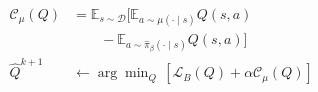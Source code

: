 \documentclass[border=7pt]{standalone}
\begin{document}
\color{ink}
$\displaystyle \begin{aligned} \mathcal C_\mu(Q)&=\mathbb E_{s\sim\mathcal D}\!\big[\mathbb E_{a\sim\mu(\cdot\mid s)}Q(s,a)\\ &\qquad-\mathbb E_{a\sim\widehat\pi_\beta(\cdot\mid s)}Q(s,a)\big]\\ \widehat Q^{k+1}&\leftarrow\arg\min_Q\,[\mathcal L_B(Q)+\alpha\mathcal C_\mu(Q)]\end{aligned}$
\end{document}
